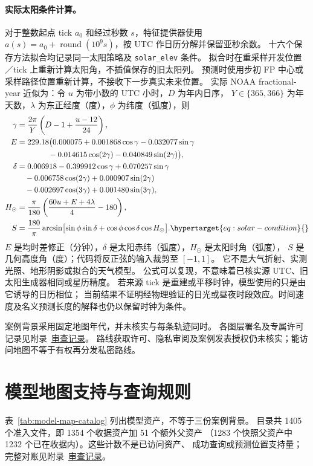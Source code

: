 \paragraph{实际太阳条件计算。}
对于整数起点 tick \(a_0\) 和经过秒数 \(s\)，特征提供器使用
\(a(s)=a_0+\operatorname{round}(10^9s)\)，按 UTC 作日历分解并保留亚秒余数。
十六个保存方法拟合均记录同一太阳策略及 \texttt{solar\_elev} 条件。
拟合时在重采样开发位置／tick 上重新计算太阳角，不插值保存的旧太阳列。
预测时使用步初 FP 中心或采样路径位置重新计算，不接收下一步真实未来位置。
实际 NOAA fractional-year 近似为\cite{noaa}：令 \(u\) 为带小数的 UTC 小时，\(D\) 为年内日序，
\(Y\in\{365,366\}\) 为年天数，\(\lambda\) 为东正经度（度），\(\phi\) 为纬度（弧度），则
\begin{align}
\gamma&=\frac{2\pi}{Y}\left(D-1+\frac{u-12}{24}\right),\nonumber\\
E&=229.18\bigl(0.000075+0.001868\cos\gamma-0.032077\sin\gamma\nonumber\\
 &\hspace{4em}-0.014615\cos(2\gamma)-0.040849\sin(2\gamma)\bigr),\nonumber\\
\delta&=0.006918-0.399912\cos\gamma+0.070257\sin\gamma\nonumber\\
 &\quad-0.006758\cos(2\gamma)+0.000907\sin(2\gamma)\nonumber\\
 &\quad-0.002697\cos(3\gamma)+0.001480\sin(3\gamma),\nonumber\\
H_\odot&=\frac{\pi}{180}\left(\frac{60u+E+4\lambda}{4}-180\right),\nonumber\\
S&=\frac{180}{\pi}\arcsin\bigl[\sin\phi\sin\delta+
          \cos\phi\cos\delta\cos H_\odot\bigr].
\label{eq:solar-condition}\hypertarget{eq:solar-condition}{}
\end{align}
\(E\) 是均时差修正（分钟），\(\delta\) 是太阳赤纬（弧度），\(H_\odot\) 是太阳时角（弧度），
\(S\) 是几何高度角（度）；代码将反正弦的输入裁剪至 \([-1,1]\)。
它不是大气折射、实测光照、地形阴影或拟合的天气模型。
公式可以复现，不意味着已核实源 UTC、旧太阳生成器相同或星历精度。
若来源 tick 是重建或平移时钟，模型使用的只是由它诱导的日历相位；
当前结果不证明经物理验证的日光或昼夜时段效应。时间速度及名义预测长度的解释也仍以保留时钟为条件。

案例背景采用固定地图年代，并未核实与每条轨迹同时。
各图层署名及专属许可记录见附录~\href{audit-notes.pdf\#sec:source-reconciliation-details}{审查记录}。
路线获取许可、隐私审阅及案例发表授权仍未核实；能访问地图不等于有权再分发私密路线。


\section{模型地图支持与查询规则}
\label{sec:model-map-support}\hypertarget{sec:model-map-support}{}
表~\ref{tab:model-map-catalog} 列出模型资产，不等于三份案例背景。
目录共 1405 个准入文件，即 1354 个收据资产加 51 个额外父资产
（1283 个快照父资产中 1232 个已在收据内）。这些计数不是已访问资产、
成功查询或预测位置支持量；完整对账见附录~\href{audit-notes.pdf\#sec:source-reconciliation-details}{审查记录}。

